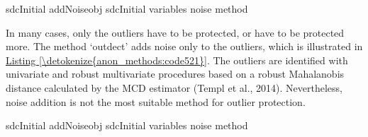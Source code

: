 \documentclass[letterpaper,10pt,english]{sphinxmanual}
\begin{document}
\def\sphinxLiteralBlockLabel{\label{\detokenize{anon_methods:code520}}}
%
\begin{sphinxVerbatim}[commandchars=\\\{\},numbers=left,firstnumber=1,stepnumber=1]
 sdcInitial  addNoiseobj  sdcInitial variables              noise   method  
\end{sphinxVerbatim}

In many cases, only the outliers have to be protected, or have to be
protected more. The method ‘outdect’ adds noise only to the outliers,
which is illustrated in \hyperref[\detokenize{anon_methods:code521}]{Listing \ref{\detokenize{anon_methods:code521}}}. The outliers are identified with
univariate and robust multivariate procedures based on a robust
Mahalanobis distance calculated by the MCD estimator (Templ et al.,
2014). Nevertheless, noise addition is not the most suitable method for
outlier protection.

\def\sphinxLiteralBlockLabel{\label{\detokenize{anon_methods:code521}}}
%
\begin{sphinxVerbatim}[commandchars=\\\{\},numbers=left,firstnumber=1,stepnumber=1]
 sdcInitial  addNoiseobj  sdcInitial variables              noise   method  
\end{sphinxVerbatim}
\end{document}
